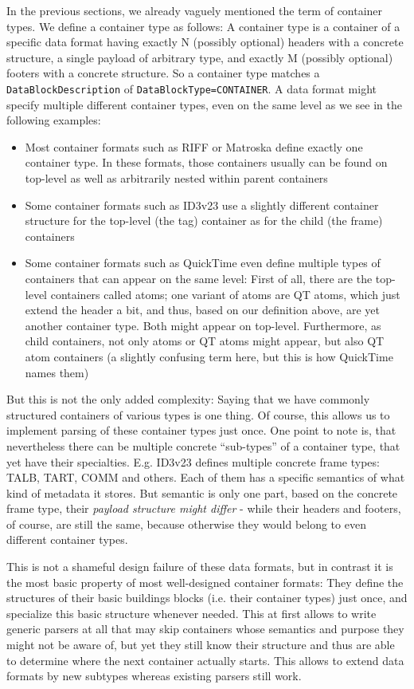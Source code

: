 In the previous sections, we already vaguely mentioned the term of container types. We define a container type as follows: A container type is a container of a specific data format having exactly N (possibly optional) headers with a concrete structure, a single payload of arbitrary type, and exactly M (possibly optional) footers with a concrete structure. So a container type matches a \texttt{DataBlockDescription} of \texttt{DataBlockType=CONTAINER}. A data format might specify multiple different container types, even on the same level as we see in the following examples: 
\begin{itemize}
\item Most container formats such as RIFF or Matroska define exactly one container type. In these formats, those containers usually can be found on top-level as well as arbitrarily nested within parent containers   
\item Some container formats such as ID3v23 use a slightly different container structure for the top-level (the tag) container as for the child (the frame) containers 
\item Some container formats such as QuickTime even define multiple types of containers that can appear on the same level: First of all, there are the top-level containers called atoms; one variant of atoms are QT atoms, which just extend the header a bit, and thus, based on our definition above, are yet another container type. Both might appear on top-level. Furthermore, as child containers, not only atoms or QT atoms might appear, but also QT atom containers (a slightly confusing term here, but this is how QuickTime names them)
\end{itemize}

But this is not the only added complexity: Saying that we have commonly structured containers of various types is one thing. Of course, this allows us to implement parsing of these container types just once. One point to note is, that nevertheless there can be multiple concrete ``sub-types'' of a container type, that yet have their specialties. E.g. ID3v23 defines multiple concrete frame types: TALB, TART, COMM and others. Each of them has a specific semantics of what kind of metadata it stores. But semantic is only one part, based on the concrete frame type, their \emph{payload structure might differ} - while their headers and footers, of course, are still the same, because otherwise they would belong to even different container types.

This is not a shameful design failure of these data formats, but in contrast it is the most basic property of most well-designed container formats: They define the structures of their basic buildings blocks (i.e. their container types) just once, and specialize this basic structure whenever needed. This at first allows to write generic parsers at all that may skip containers whose semantics and purpose they might not be aware of, but yet they still know their structure and thus are able to determine where the next container actually starts. This allows to extend data formats by new subtypes whereas existing parsers still work.


